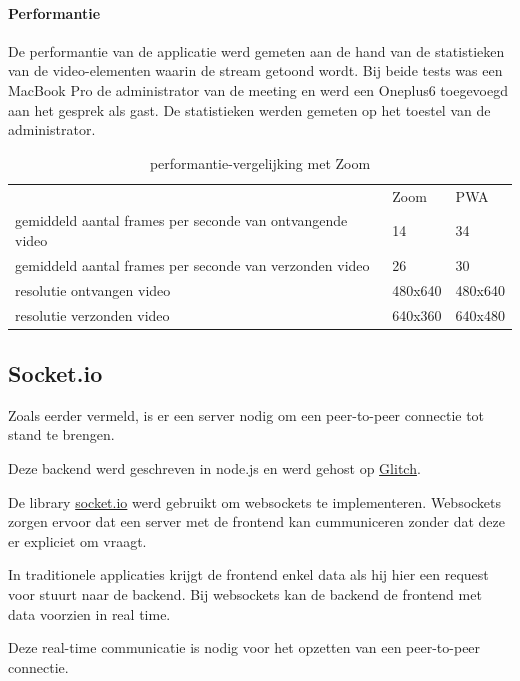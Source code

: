 		\paragraph{Performantie}
		
			De performantie van de applicatie werd gemeten aan de hand van de statistieken van de video-elementen waarin de stream getoond wordt. Bij beide tests was een MacBook Pro de administrator van de meeting en werd een Oneplus6 toegevoegd aan het gesprek als gast. De statistieken werden gemeten op het toestel van de administrator.
			
			\begin{table}[H]
			\centering
			\begin{tabular}{lll}													& Zoom 			& PWA \\
				gemiddeld aantal frames per seconde van ontvangende video 	 & 14				&  34 \\
				gemiddeld aantal frames per seconde van verzonden video		   & 26				   & 30	 \\
				resolutie ontvangen video  						  & 480x640 	&  480x640  \\
				resolutie verzonden video						   & 640x360	& 	640x480\\
			\end{tabular}	
			\caption{performantie-vergelijking met Zoom}
			\end{table}
	

	\subsection{Socket.io}
	
		Zoals eerder vermeld, is er een server nodig om een peer-to-peer connectie tot stand te brengen.
		
		Deze backend werd geschreven in node.js en werd gehost op \href{https://glitch.com/}{Glitch}.
		
		De library \href{https://socket.io/}{socket.io} werd gebruikt om websockets te implementeren. Websockets zorgen ervoor dat een server met de frontend kan cummuniceren zonder dat deze er expliciet om vraagt. 
		
		In traditionele applicaties krijgt de frontend enkel data als hij hier een request voor stuurt naar de backend. Bij websockets kan de backend de frontend met data voorzien in real time.
		\autocite{Mozilla2020e}
		
		Deze real-time communicatie is nodig voor het opzetten van een peer-to-peer connectie.
		
